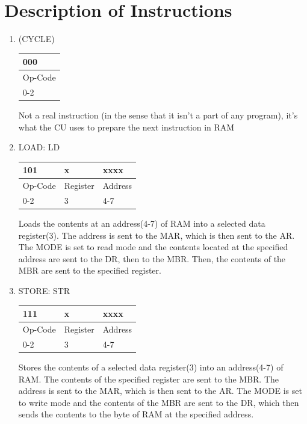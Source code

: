 \documentclass{mcgillhomework}
\begin{document}
	\section{Description of Instructions}
	\begin{enumerate}
		\item (CYCLE)\\
		\begin{tabularx}{\textwidth}{|X|}
			\hline 000
			\\ \hline Op-Code
			\\ \hline 0-2
			\\ \hline
		\end{tabularx}
		Not a real instruction (in the sense that it isn't a part of any program), it's what the CU uses to prepare the next instruction in RAM
		
		\item LOAD: LD\\
		\begin{tabularx}{\textwidth}{|X|X|X|}
			\hline 101 & x & xxxx
			\\ \hline Op-Code & Register & Address
			\\ \hline 0-2 & 3 & 4-7
			\\ \hline
		\end{tabularx}
		Loads the contents at an address(4-7) of RAM into a selected data register(3). The address is sent to the MAR, which is then sent to the AR. The MODE is set to read mode and the contents located at the specified address are sent to the DR, then to the MBR. Then, the contents of the MBR are sent to the specified register.
		
		\item STORE: STR\\
		\begin{tabularx}{\textwidth}{|X|X|X|}
			\hline 111 & x & xxxx
			\\ \hline Op-Code & Register & Address
			\\ \hline 0-2 & 3 & 4-7
			\\ \hline
		\end{tabularx}
		Stores the contents of a selected data register(3) into an address(4-7) of RAM. The contents of the specified register are sent to the MBR. The address is sent to the MAR, which is then sent to the AR. The MODE is set to write mode and the contents of the MBR are sent to the DR, which then sends the contents to the byte of RAM at the specified address.
		

\end{enumerate}
\end{document}
